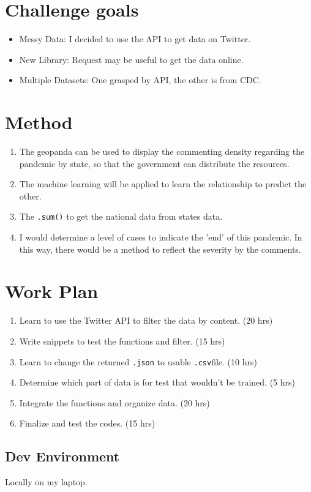 \documentclass[12pt,a4paper]{article}
\begin{document}
	\section*{Challenge goals}
	\begin{itemize}
		\item Messy Data: I decided to use the API to get data on Twitter.
		\item New Library: Request may be useful to get the data online.
		\item Multiple Datasets: One grasped by API, the other is from CDC.
	\end{itemize}
	\section*{Method}
	\begin{enumerate}
		\item The geopanda can be used to display the commenting density regarding the pandemic by state, so that the government can distribute the resources.
		\item The machine learning will be applied to learn the relationship to predict the other.
		\item The \texttt{.sum()} to get the national data from states data.
		\item I would determine a level of cases to indicate the 'end' of this pandemic. In this way, there would be a method to reflect the severity by the comments.
	\end{enumerate}
	
	\section*{Work Plan}
	\begin{enumerate}
		\item Learn to use the Twitter API to filter the data by content. (20 hrs)
		\item Write snippets to test the functions and filter. (15 hrs)
		\item Learn to change the returned \texttt{.json} to usable \texttt{.csv}file. (10 hrs)
		\item Determine which part of data is for test that wouldn't be trained. (5 hrs)
		\item Integrate the functions and organize data. (20 hrs)
		\item Finalize and test the codes. (15 hrs)
	\end{enumerate}
	\subsection*{Dev Environment}
	Locally on my laptop.
\end{document}
